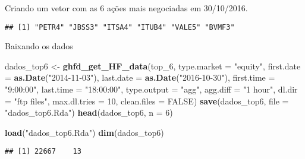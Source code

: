 \documentclass[]{article}
\newenvironment{Shaded}{\begin{snugshade}}{\end{snugshade}}
\newcommand{\KeywordTok}[1]{\textcolor[rgb]{0.13,0.29,0.53}{\textbf{{#1}}}}
\newcommand{\DataTypeTok}[1]{\textcolor[rgb]{0.13,0.29,0.53}{{#1}}}
\newcommand{\DecValTok}[1]{\textcolor[rgb]{0.00,0.00,0.81}{{#1}}}
\newcommand{\StringTok}[1]{\textcolor[rgb]{0.31,0.60,0.02}{{#1}}}
\newcommand{\OtherTok}[1]{\textcolor[rgb]{0.56,0.35,0.01}{{#1}}}
\newcommand{\NormalTok}[1]{{#1}}
\begin{document}
Criando um vetor com as 6 ações mais negociadas em 30/10/2016.

\begin{Shaded}
\end{Shaded}

\begin{verbatim}
## [1] "PETR4" "JBSS3" "ITSA4" "ITUB4" "VALE5" "BVMF3"
\end{verbatim}

Baixando os dados

\begin{Shaded}
\begin{Highlighting}[]
\NormalTok{dados_top6 <-}\StringTok{ }\KeywordTok{ghfd_get_HF_data}\NormalTok{(top_6, }\DataTypeTok{type.market =} \StringTok{"equity"}\NormalTok{, }\DataTypeTok{first.date =} \KeywordTok{as.Date}\NormalTok{(}\StringTok{"2014-11-03"}\NormalTok{), }
    \DataTypeTok{last.date =} \KeywordTok{as.Date}\NormalTok{(}\StringTok{"2016-10-30"}\NormalTok{), }\DataTypeTok{first.time =} \StringTok{"9:00:00"}\NormalTok{, }\DataTypeTok{last.time =} \StringTok{"18:00:00"}\NormalTok{, }
    \DataTypeTok{type.output =} \StringTok{"agg"}\NormalTok{, }\DataTypeTok{agg.diff =} \StringTok{"1 hour"}\NormalTok{, }\DataTypeTok{dl.dir =} \StringTok{"ftp files"}\NormalTok{, }\DataTypeTok{max.dl.tries =} \DecValTok{10}\NormalTok{, }
    \DataTypeTok{clean.files =} \OtherTok{FALSE}\NormalTok{)}
\KeywordTok{save}\NormalTok{(dados_top6, }\DataTypeTok{file =} \StringTok{"dados_top6.Rda"}\NormalTok{)}
\KeywordTok{head}\NormalTok{(dados_top6, }\DataTypeTok{n =} \DecValTok{6}\NormalTok{)}
\end{Highlighting}
\end{Shaded}

\begin{Shaded}
\begin{Highlighting}[]
\KeywordTok{load}\NormalTok{(}\StringTok{"dados_top6.Rda"}\NormalTok{)}
\KeywordTok{dim}\NormalTok{(dados_top6)}
\end{Highlighting}
\end{Shaded}

\begin{verbatim}
## [1] 22667    13
\end{verbatim}
\end{document}
